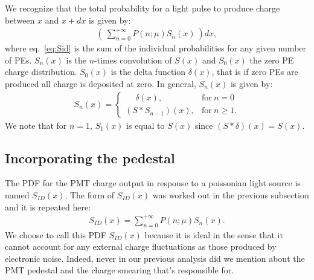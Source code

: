 \documentclass[a4paper,11pt]{article}
\begin{document}
We recognize that the total probability for a light pulse to produce charge between $x$ and $x+dx$ is given by: 
\begin{align}
\left( \ \sum_{n=0}^{+\infty} P( n; \mu ) S_n(x) \ \right) dx,
\label{eq:Sid}
\end{align}
where eq.~\eqref{eq:Sid} is the sum of the individual probabilities for any given number of PEs.
$S_n(x)$ is the $n$-times convolution of $S(x)$ and $S_0(x)$ the zero PE charge distribution. 
$S_0(x)$ is the delta function $\delta(x)$, that is if zero PEs are produced all charge is deposited at zero.  
In general, $S_n(x)$ is given by:
\begin{align}
S_n(x)  = \begin{cases}
   \ \quad \delta (x),       & \text{for}  \ n = 0 \\
    (S*S_{n-1})(x),  & \text{for} \ n \geqslant 1 .
  \end{cases}
\end{align}
We note that for $n=1$,  $S_1(x)$ is equal to $S(x)$ since $ (S * \delta)(x) = S(x) $. 


\subsection{Incorporating the pedestal}
%

The PDF for the PMT charge output in response to a poissonian light source is named $S_{ID}(x)$. 
The form of $S_{ID}(x)$ was worked out in the previous subsection and it is repeated here:
\begin{align}
S_{ID}(x) = \sum_{n=0}^{+\infty} P( n; \mu ) S_n(x). 
\label{eq:Sid2}
\end{align}
We choose to call this PDF $S_{ID}(x)$ because it is ideal in the sense that it cannot account for any external charge fluctuations as those produced by electronic noise.
Indeed, never in our previous analysis did we mention about the PMT pedestal and the charge smearing that's responsible for. 
\end{document}
